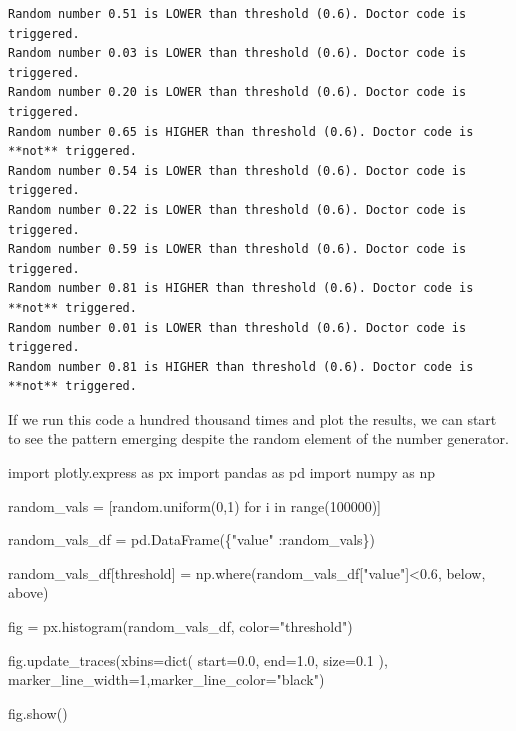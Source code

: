 \documentclass[
  letterpaper,
  DIV=11,
  numbers=noendperiod]{scrreprt}
\newenvironment{Shaded}{}{}
\newcommand{\BuiltInTok}[1]{\textcolor[rgb]{0.84,0.23,0.29}{#1}}
\newcommand{\ControlFlowTok}[1]{\textcolor[rgb]{0.84,0.23,0.29}{#1}}
\newcommand{\DecValTok}[1]{\textcolor[rgb]{0.00,0.36,0.77}{#1}}
\newcommand{\FloatTok}[1]{\textcolor[rgb]{0.00,0.36,0.77}{#1}}
\newcommand{\ImportTok}[1]{\textcolor[rgb]{0.01,0.18,0.38}{#1}}
\newcommand{\KeywordTok}[1]{\textcolor[rgb]{0.84,0.23,0.29}{#1}}
\newcommand{\NormalTok}[1]{\textcolor[rgb]{0.14,0.16,0.18}{#1}}
\newcommand{\OperatorTok}[1]{\textcolor[rgb]{0.14,0.16,0.18}{#1}}
\newcommand{\StringTok}[1]{\textcolor[rgb]{0.01,0.18,0.38}{#1}}
\begin{document}
\begin{verbatim}
Random number 0.51 is LOWER than threshold (0.6). Doctor code is triggered.
Random number 0.03 is LOWER than threshold (0.6). Doctor code is triggered.
Random number 0.20 is LOWER than threshold (0.6). Doctor code is triggered.
Random number 0.65 is HIGHER than threshold (0.6). Doctor code is **not** triggered.
Random number 0.54 is LOWER than threshold (0.6). Doctor code is triggered.
Random number 0.22 is LOWER than threshold (0.6). Doctor code is triggered.
Random number 0.59 is LOWER than threshold (0.6). Doctor code is triggered.
Random number 0.81 is HIGHER than threshold (0.6). Doctor code is **not** triggered.
Random number 0.01 is LOWER than threshold (0.6). Doctor code is triggered.
Random number 0.81 is HIGHER than threshold (0.6). Doctor code is **not** triggered.
\end{verbatim}

If we run this code a hundred thousand times and plot the results, we
can start to see the pattern emerging despite the random element of the
number generator.

\begin{Shaded}
\begin{Highlighting}[]
\ImportTok{import}\NormalTok{ plotly.express }\ImportTok{as}\NormalTok{ px}
\ImportTok{import}\NormalTok{ pandas }\ImportTok{as}\NormalTok{ pd}
\ImportTok{import}\NormalTok{ numpy }\ImportTok{as}\NormalTok{ np}

\NormalTok{random\_vals }\OperatorTok{=}\NormalTok{ [random.uniform(}\DecValTok{0}\NormalTok{,}\DecValTok{1}\NormalTok{) }\ControlFlowTok{for}\NormalTok{ i }\KeywordTok{in} \BuiltInTok{range}\NormalTok{(}\DecValTok{100000}\NormalTok{)]}

\NormalTok{random\_vals\_df }\OperatorTok{=}\NormalTok{ pd.DataFrame(\{}\StringTok{"value"}\NormalTok{ :random\_vals\})}

\NormalTok{random\_vals\_df[}\StringTok{\textquotesingle{}threshold\textquotesingle{}}\NormalTok{] }\OperatorTok{=}\NormalTok{ np.where(random\_vals\_df[}\StringTok{"value"}\NormalTok{]}\OperatorTok{\textless{}}\FloatTok{0.6}\NormalTok{, }\StringTok{\textquotesingle{}below\textquotesingle{}}\NormalTok{, }\StringTok{\textquotesingle{}above\textquotesingle{}}\NormalTok{)}

\NormalTok{fig }\OperatorTok{=}\NormalTok{ px.histogram(random\_vals\_df, color}\OperatorTok{=}\StringTok{"threshold"}\NormalTok{)}

\NormalTok{fig.update\_traces(xbins}\OperatorTok{=}\BuiltInTok{dict}\NormalTok{(}
\NormalTok{        start}\OperatorTok{=}\FloatTok{0.0}\NormalTok{,}
\NormalTok{        end}\OperatorTok{=}\FloatTok{1.0}\NormalTok{,}
\NormalTok{        size}\OperatorTok{=}\FloatTok{0.1}
\NormalTok{    ),}
\NormalTok{    marker\_line\_width}\OperatorTok{=}\DecValTok{1}\NormalTok{,marker\_line\_color}\OperatorTok{=}\StringTok{"black"}\NormalTok{)}


\NormalTok{fig.show()}
\end{Highlighting}
\end{Shaded}
\end{document}

